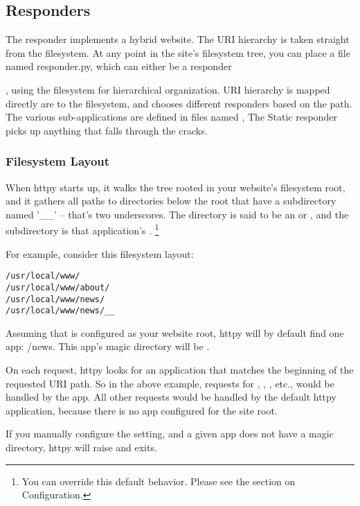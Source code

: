 \subsection{ Responders \label{multiple}}

The  responder implements a hybrid website. The URI hierarchy is
taken straight from the filesystem. At any point in the site's filesystem tree,
you can place a file named responder.py, which can either be a responder

, using the filesystem for hierarchical organization. URI hierarchy is
mapped directly are to the filesystem, and chooses different responders based on
the path. The various sub-applications are defined in files named
, The Static responder picks up anything that falls through
the cracks.

\subsubsection{Filesystem Layout}

When httpy starts up, it walks the tree rooted in your website's filesystem
root, and it gathers all paths to directories below the root that have a
subdirectory named '__' -- that's two underscores. The directory is said to be
an  or , and the subdirectory is that application's
. \footnote{You can override this default behavior. Please
see the section on Configuration.}

For example, consider this filesystem layout:

\begin{verbatim}
/usr/local/www/
/usr/local/www/about/
/usr/local/www/news/
/usr/local/www/news/__
\end{verbatim}

Assuming that  is configured as your website root, httpy
will by default find one app: /news. This app's magic directory will be
.

On each request, httpy looks for an application that matches the beginning of
the requested URI path. So in the above example, requests for ,
, , etc., would be handled by the
 app. All other requests would be handled by the default httpy
application, because there is no app configured for the site root.

If you manually configure the  setting, and a given app does not have
a magic directory, httpy will raise  and exits.



